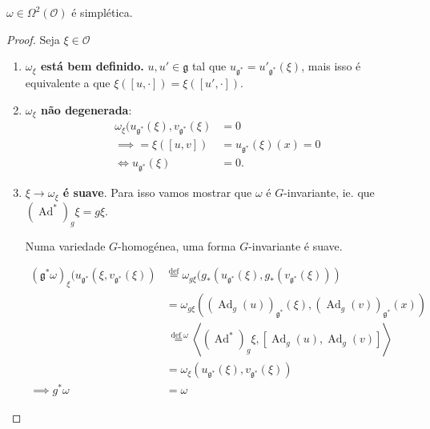 \begin{thm}[KKS=Kirillov-Kostant-Sourian]
	$\omega\in\Omega^{2}(\mathcal{O})$ é simplética.
\end{thm}

\begin{proof} Seja $\xi \in\mathcal{O}$
	\begin{enumerate}[label=\textbf{Paso \arabic*}]
		\item \textbf{$\omega_\xi$ está bem definido.} $u,u'\in\mathfrak{g}$ tal que $u_{\mathfrak{g}^*}=u'_{\mathfrak{g}^*}(\xi )$, mais isso é equivalente a que $\xi([u,\cdot ])=\xi([u',\cdot ])$.

	\item \textbf{$\omega_\xi$ não degenerada}:
			\begin{align*}
				\omega_\xi(u_{\mathfrak{g}^*}(\xi ),v_{\mathfrak{g}^*}(\xi )&=0\\
				\implies =\xi([u,v])&=u_{\mathfrak{g}^*}(\xi )(x)=0\\
				\iff u_{\mathfrak{g}^*}(\xi)&=0.
			\end{align*}

\item \textbf{$\xi \longrightarrow \omega_\xi$ é suave}. Para isso vamos mostrar que $\omega$ é $G$-invariante, ie. que $(\operatorname{Ad}^*)_g\xi =g\xi$.

	\begin{exercise}
		Numa variedade $G $-homogénea, uma forma $G$-invariante é suave.
	\end{exercise}
\begin{align*}
	(\mathfrak{g}^*\omega )_\xi(u_{\mathfrak{g}^*}(\xi,v_{\mathfrak{g}^*}(\xi))&\overset{\operatorname{def}}{=}\omega_{g\xi}(g_*(u_{\mathfrak{g}^*}(\xi ),g_*(v_{\mathfrak{g}^*}(\xi )))\\
	&=\omega_{g\xi}\left((\operatorname{Ad}_g(u))_{\mathfrak{g}^*}(\xi ),(\operatorname{Ad}_g(v))_{\mathfrak{g}^*}(x)\right)\\
	&\overset{\operatorname{def}\omega}{=}\left<(\operatorname{Ad}^*)_g\xi,[\operatorname{Ad}_g(u),\operatorname{Ad}_g(v)]\right> \\
	&=\omega_\xi(u_{\mathfrak{g}^*}(\xi ),v_{\mathfrak{g}^*}(\xi ))\\
	\implies g^*\omega &=\omega
\end{align*}


\end{enumerate}
\end{proof}

